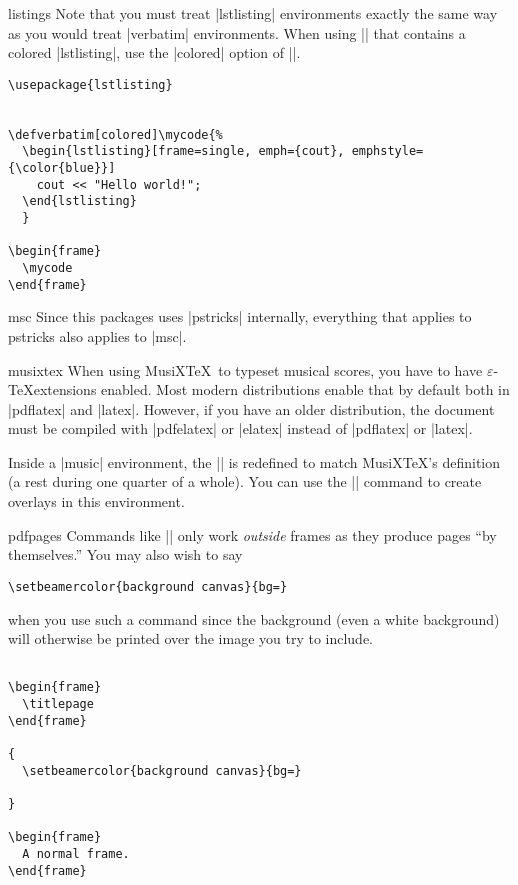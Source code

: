 \begin{package}{{listings}}
  \beamernote
  Note that you must treat |lstlisting| environments exactly the same way as you would treat |verbatim| environments. When using || that contains a colored |lstlisting|, use the |colored| option of ||.
  \example
\begin{verbatim}
\usepackage{lstlisting}


\defverbatim[colored]\mycode{%
  \begin{lstlisting}[frame=single, emph={cout}, emphstyle={\color{blue}}]
    cout << "Hello world!";
  \end{lstlisting}
  }

\begin{frame}
  \mycode
\end{frame}

\end{verbatim}
\end{package}

\begin{package}{{msc}}
  \beamernote
  Since this packages uses |pstricks| internally, everything that applies to pstricks also applies to |msc|.
\end{package}

\begin{package}{{musixtex}}
  When using MusiX\TeX\ to typeset musical scores, you have to have $\varepsilon$-\TeX extensions enabled. Most modern distributions enable that by default both in |pdflatex| and |latex|. However, if you have an older distribution, the document must be compiled with |pdfelatex| or |elatex| instead of |pdflatex| or |latex|.

  Inside a |music| environment, the |\pause| is redefined to match MusiX\TeX's definition (a rest during one quarter of a whole). You can use the |\beamerpause| command to create overlays in this environment.
\end{package}

\begin{package}{{pdfpages}}
  Commands like || only work \emph{outside} frames as they produce pages ``by themselves.'' You may also wish to say
\begin{verbatim}
\setbeamercolor{background canvas}{bg=}
\end{verbatim}
  when you use such a command since the background (even a white background) will otherwise be printed over the image you try to include.

  \example
\begin{verbatim}

\begin{frame}
  \titlepage
\end{frame}

{
  \setbeamercolor{background canvas}{bg=}
  
}

\begin{frame}
  A normal frame.
\end{frame}

\end{verbatim}
\end{package}


